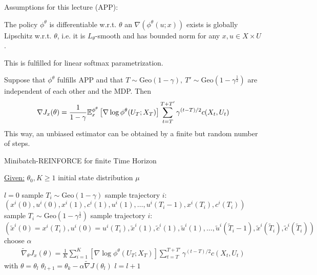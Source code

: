 Assumptions for this lecture (APP):  

The policy \(\phi^\theta\) is differentiable w.r.t. \(\theta\) an \(\nabla(\phi^\theta(u;x))\) exists 
is globally Lipschitz w.r.t. \(\theta\), i.e. it is \(L_\theta\)-smooth and has bounded 
norm for any \(x,u\in X\times U\). 

This is fulfilled for linear softmax parametrization.

\begin{proposition}\label{prop:58}
    Suppose that \(\phi^\theta\) fulfills APP and that 
    \(T\sim\text{Geo}(1-\gamma),\ T'\sim\text{Geo}(1-\gamma^{\frac{1}{2}})\) are independent
    of each other and the MDP. Then 
    \[\nabla J_x(\theta)=\frac{1}{1-\gamma}\mathbb{E}_x^{\phi^\theta}\left[\nabla\log \phi^\theta(U_T;X_T)\right]\sum_{t=T}^{T+T'}\gamma^{(t-T)/2}c(X_t,U_t)\]
    This way, an unbiased estimator can be obtained by a finite but random number of steps. 
\end{proposition}

\begin{algorithm}[H]
    \caption{Minibatch-REINFORCE for finite Time Horizon}\label{alg:reinforce_ft}
    \underline{Given:} \(\theta_0,K\geq 1\) initial state distribution \(\mu\)
    \begin{algorithmic}
    \State \(l=0\)
            \State sample \(T_i\sim \text{Geo}(1-\gamma)\)
            \State sample trajectory \(i\): \((x^i(0),u^i(0),x^i(1),c^i(1),u^i(1),\dots, u^i(T_i-1),x^i(T_i),c^i(T_i))\) 
            \State sample \(T_i\sim \text{Geo}(1-\gamma^{\frac{1}{2}})\)
            \State sample trajectory \(i\): \((\tilde{x}^i(0)=x^i(T_i),u^i(0)=u^i(T_i),\tilde x^i(1),\tilde c^i(1),\tilde u^i(1),\dots,\tilde u^i(\tilde T_i-1),\tilde x^i(\tilde T_i),\tilde c^i(\tilde T_i))\)
        \EndFor
        \State choose \(\alpha\)
        \State \begin{align*}
            \tilde{\nabla}_\theta J_x(\theta)=\frac{1}{K}\sum_{i=1}^K\left[\nabla\log \phi^\theta(U_T;X_T)\right]\sum_{t=T}^{T+T'}\gamma^{(t-T)/2}c(X_t,U_t)
        \end{align*} with \(\theta=\theta_l\)
        \State \(\theta_{l+1}=\theta_k-\alpha \tilde{\nabla}J(\theta_l)\)
        \State \(l=l+1\) 
    \EndWhile
\end{algorithmic}
\end{algorithm}

